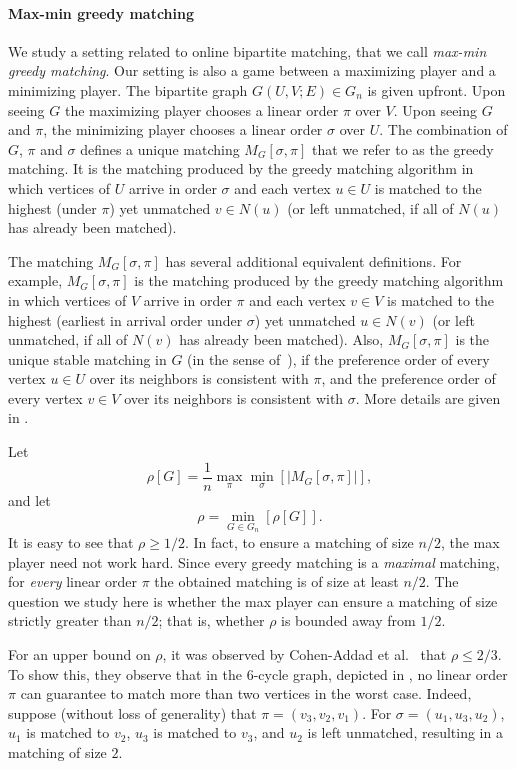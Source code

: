 \paragraph*{Max-min greedy matching} We study a setting related to online bipartite matching, that we call
%
%
%
%
\emph{max-min greedy matching}.   %
Our setting is also a game between a maximizing player and a minimizing player. The bipartite graph $G(U,V;E)\in G_n$ is given upfront. Upon seeing $G$ the maximizing player chooses a linear order $\pi$ over $V$. Upon seeing $G$ and $\pi$, the minimizing player chooses a linear order $\sigma$ over $U$.
The combination of $G$, $\pi$ and $\sigma$ %
defines   %
a unique matching $M_G[\sigma,\pi]$ that we refer to as the greedy matching.
It is the matching produced by the greedy matching algorithm in which vertices of $U$ arrive in order $\sigma$ and each vertex $u \in U$ is matched to the highest (under $\pi$) yet unmatched $v \in N(u)$ (or left unmatched, if
%
all of $N(u)$ has already been matched).   %

The matching $M_G[\sigma,\pi]$ has several additional equivalent definitions.
For example, $M_G[\sigma,\pi]$ is the matching produced by the greedy matching algorithm in which vertices of $V$ arrive in order $\pi$ and each vertex $v \in V$ is matched to the highest (earliest in arrival order under $\sigma$) yet unmatched $u \in N(v)$ (or left unmatched, if
%
all of $N(v)$ has already been matched).  %
Also, $M_G[\sigma,\pi]$ is the unique stable matching in $G$ (in the sense of~\cite{GS62}), if the preference order of every vertex $u \in U$ over its neighbors is consistent with $\pi$, and the preference order of every vertex $v \in V$ over its neighbors is consistent with $\sigma$. More details are given in .

Let $$\rho[G] = \frac{1}{n} \max_{\pi} \min_{\sigma}[|M_G[\sigma,\pi]|],$$ and let $$\rho = \min_{G \in G_n}[\rho[G]].$$
It is easy to see that $\rho \ge 1/2$.
In fact, to ensure a matching of size $n/2$, the max player need not work hard.
Since every greedy matching is a \emph{maximal} matching, for \emph{every} linear order $\pi$ the obtained matching is of size at least $n/2$.
The question we study %
here  %
is whether the max player can ensure a matching of size strictly 
greater than $n/2$; that is, whether $\rho$ is bounded away from $1/2$.  
%
%
%

For an upper bound on $\rho$, it was observed by Cohen-Addad et al.~\cite{Cohen-AddadEFF16} that $\rho \leq 2/3$.
To show this, they observe that in the 6-cycle graph, depicted in , no linear order $\pi$ can guarantee to match more than two vertices in the worst case. Indeed, suppose (without loss of generality) that $\pi=(v_3,v_2,v_1)$. For $\sigma=(u_1,u_3,u_2)$, $u_1$ is matched to $v_2$, $u_3$ is matched to $v_3$, and $u_2$ is left unmatched, resulting in a matching of size $2$.

